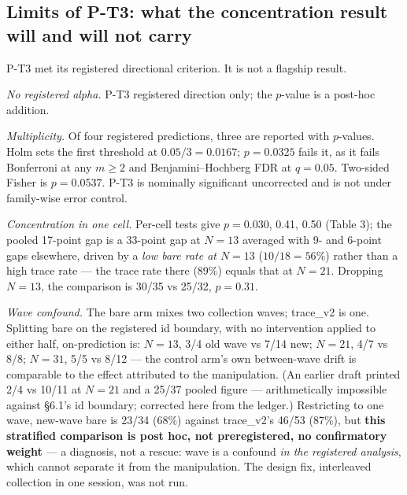 \subsection{Limits of P-T3: what the concentration result will and will not carry}

P-T3 met its registered directional criterion. It is not a flagship result.

\emph{No registered alpha.} P-T3 registered direction only; the $p$-value is a post-hoc addition.

\emph{Multiplicity.} Of four registered predictions, three are reported with $p$-values. Holm sets the
first threshold at $0.05/3 = 0.0167$; $p = 0.0325$ fails it, as it fails Bonferroni at any $m \ge 2$ and
Benjamini--Hochberg FDR at $q = 0.05$. Two-sided Fisher is $p = 0.0537$. P-T3 is nominally significant
uncorrected and is not under family-wise error control.

\emph{Concentration in one cell.} Per-cell tests give $p = 0.030$, 0.41, 0.50 (Table 3); the pooled
17-point gap is a 33-point gap at $N = 13$ averaged with 9- and 6-point gaps elsewhere, driven by a
\emph{low bare rate at $N = 13$} ($10/18 = 56\%$) rather than a high trace rate --- the trace rate there (89\%)
equals that at $N = 21$. Dropping $N = 13$, the comparison is 30/35 vs 25/32, $p = 0.31$.

\emph{Wave confound.} The bare arm mixes two collection waves; trace\_v2 is one. Splitting bare on the
registered id boundary, with no intervention applied to either half, on-prediction is: $N = 13$, 3/4
old wave vs 7/14 new; $N = 21$, 4/7 vs 8/8; $N = 31$, 5/5 vs 8/12 --- the control arm's own
between-wave drift is comparable to the effect attributed to the manipulation. (An earlier
draft printed 2/4 vs 10/11 at $N = 21$ and a 25/37 pooled figure --- arithmetically impossible
against \S6.1's id boundary; corrected here from the ledger.) Restricting to one
wave, new-wave bare is 23/34 (68\%) against trace\_v2's 46/53 (87\%), but \textbf{this stratified
comparison is post hoc, not preregistered, no confirmatory weight} --- a diagnosis, not a rescue:
wave is a confound \emph{in the registered analysis}, which cannot separate it from the manipulation.
The design fix, interleaved collection in one session, was not run.

